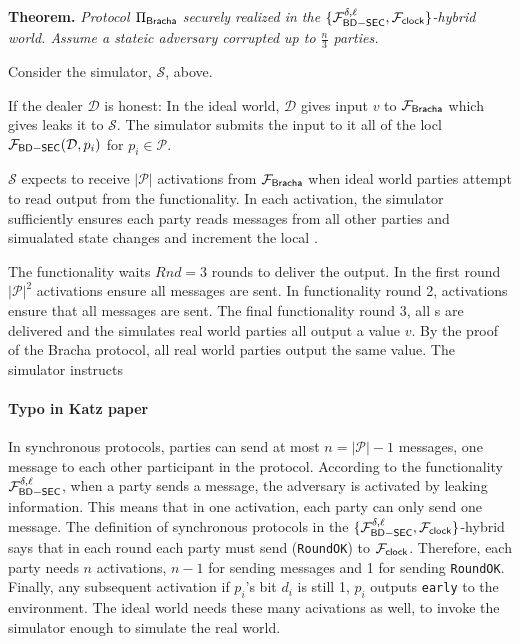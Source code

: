 \begin{figure}[!h]
	
\end{figure}
\begin{figure}
	
\end{figure}

{\bf Theorem.} {\em Protocol $\Pi_{{\mathsf {Bracha}}}$ securely realized \Fbc in the $\{\mathcal{F}_{{\mathsf {BD-SEC}}}^{\delta,\ell},\mathcal{F}_{{\mathsf {clock}}} \}$-hybrid world. Assume a stateic adversary corrupted up to $\frac{n}{3}$ parties.}

Consider the simulator, $\mathcal{S}$, above.

If the dealer $\mathcal{D}$ is honest: In the ideal world, $\mathcal{D}$ gives input $v$ to $\mathcal{F}_{{\mathsf {Bracha}}}$ which gives leaks it to $\mathcal{S}$.
The simulator submits the input to it all of the locl $\mathcal{F}_{{\mathsf {BD-SEC}}}(\mathcal{D},p_i)$ for $p_i \in  \mathcal{P}$.

$\mathcal{S}$ expects to receive $|\mathcal{P}|$ activations from $\mathcal{F}_{{\mathsf {Bracha}}}$ when ideal world parties attempt to read output from the functionality.
In each activation, the simulator sufficiently ensures each party reads messages from all other parties and simualated state changes and increment the local \Fclock.

The functionality waits $Rnd = 3$ rounds to deliver the output. In the first round $|\mathcal{P}|^2$ activations ensure all  messages are sent.
In functionality round 2, activations ensure that all  messages are sent. The final functionality round 3, all s are delivered and the simulates real world parties all output a value $v$.
By the proof of the Bracha protocol, all real world parties output the same value. The simulator instructs 

\paragraph{Typo in Katz paper}
In synchronous protocols, parties can send at most $n = |\mathcal{P}|-1$ messages, one message to each other participant in the protocol.
According to the functionality $\mathcal{F}_{{\mathsf {BD-SEC}}}^{\delta,\ell}$, when a party sends a message, the adversary is activated by leaking information.
This means that in one activation, each party can only send one message.
The definition of synchronous protocols in the $\{\mathcal{F}_{{\mathsf {BD-SEC}}}^{\delta,\ell},\mathcal{F}_{{\mathsf {clock}}} \}$-hybrid says that in each round each party must send (\texttt{RoundOK}) to $\mathcal{F}_{{\mathsf {clock}}}$.
Therefore, each party needs $n$ activations, $n-1$ for sending messages and 1 for sending \texttt{RoundOK}.
Finally, any subsequent activation if $p_i$'s bit $d_i$ is still 1, $p_i$ outputs \texttt{early} to the environment.
The ideal world needs these many acivations as well, to invoke the simulator enough to simulate the real world.


